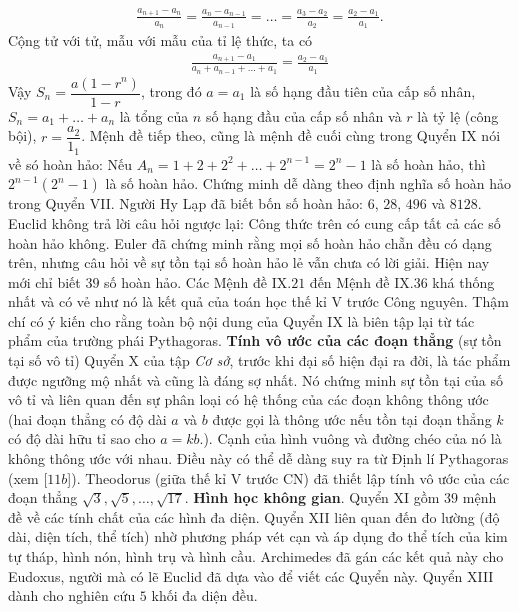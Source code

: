 \begin{multicols}{2}
\begin{align*}
		\frac{a_{n+1} - a_n}{a_n} = \frac{a_n - a_{n-1}}{a_{n-1}} = \ldots = \frac{a_3 - a_2}{a_2} = \frac{a_2 - a_1}{a_1}.		
	\end{align*}
	Cộng tử với tử, mẫu với mẫu của tỉ lệ thức, ta có
	\begin{align*}
		\frac{a_{n+1} - a_1}{a_n + a_{n-1} + \ldots + a_1} = \frac{a_2 - a_1}{a_1}		
	\end{align*}
	Vậy  $S_n = \dfrac{a(1-r^n)}{1 -r}$,
	\vskip 0.1cm 
	trong đó $a = a_1$  là số hạng đầu tiên của cấp số nhân, $S_n = a_1 + \ldots + a_n$  là tổng của $n$  số hạng đầu của cấp số nhân và  $r$ là tỷ lệ (công bội), $r = \dfrac{a_2}{1_1}$.
	\vskip 0.1cm  
	Mệnh đề tiếp theo, cũng là mệnh đề cuối cùng trong Quyển IX nói về só hoàn hảo: Nếu  $A_n = 1 + 2 + 2^2 + \ldots + 2^{n-1} = 2^n -1$ là số hoàn hảo, thì  $2^{n-1}\left(2^n - 1\right)$ là số hoàn hảo. Chứng minh dễ dàng theo định nghĩa số hoàn hảo trong Quyển VII. Người Hy Lạp đã biết bốn số hoàn hảo: $6$, $28$, $496$ và $8128$.  Euclid không trả lời câu hỏi ngược lại: Công thức trên có cung cấp tất cả các số hoàn hảo không. Euler đã chứng minh rằng mọi số hoàn hảo chẵn đều có dạng trên, nhưng câu hỏi về sự tồn tại số hoàn hảo lẻ vẫn chưa có lời giải. Hiện nay mới chỉ biết $39$ số hoàn hảo.
	\vskip 0.1cm
	Các Mệnh đề IX.$21$ đến Mệnh đề IX.$36$ khá thống nhất và có vẻ như nó là kết quả của toán học thế kỉ V trước Công nguyên. Thậm chí có ý kiến cho rằng toàn bộ nội dung của Quyển IX là biên tập lại từ tác phẩm của trường phái Pythagoras.
	\vskip 0.1cm
	\textbf{\color{lichsutoanhoc}Tính vô ước của các đoạn thẳng} (sự tồn tại số vô tỉ) Quyển X của tập \textit{Cơ sở}, trước khi đại số hiện đại ra đời, là tác phẩm được ngưỡng mộ nhất và cũng là đáng sợ nhất. Nó chứng minh sự tồn tại của số vô tỉ và liên quan đến sự phân loại có hệ thống của các đoạn không thông ước (hai đoạn thẳng có độ dài $a$  và $b$  được gọi là thông ước nếu tồn tại đoạn thẳng $k$  có độ dài hữu tỉ sao cho  $a = kb.$). Cạnh của hình vuông và đường chéo của nó là không thông ước với nhau. Điều này có thể dễ dàng suy ra từ Định lí Pythagoras (xem [$11b$]). Theodorus (giữa thế kỉ V trước CN) đã thiết lập tính vô ước của các đoạn thẳng $\sqrt{3}, \sqrt{5},\ldots, \sqrt{17}$.
	\vskip 0.1cm
	\textbf{\color{lichsutoanhoc}Hình học không gian}. Quyển XI gồm $39$ mệnh đề về các tính chất của các hình đa diện. Quyển XII liên quan đến đo lường (độ dài, diện tích, thể tích)  nhờ phương pháp vét cạn và áp dụng đo thể tích của kim tự tháp, hình nón, hình trụ và hình cầu. Archimedes đã gán các kết quả này cho Eudoxus, người mà có lẽ Euclid đã dựa vào để viết các Quyển này.  Quyển XIII dành cho nghiên cứu $5$ khối đa diện đều.

\end{multicols}
